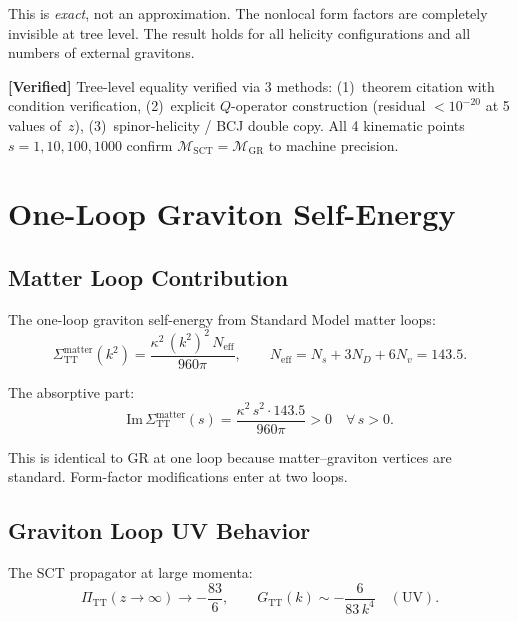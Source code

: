 \documentclass[11pt,a4paper]{article}
\theoremstyle{definition}
\theoremstyle{remark}
\newcommand{\verified}[1]{%
  \par\smallskip\noindent
  \colorbox{green!10}{\parbox{\dimexpr\linewidth-2\fboxsep}{%
    \textcolor{green!50!black}{\textbf{[Verified]}} #1}}%
  \par\smallskip}
\begin{document}
This is \emph{exact}, not an approximation. The nonlocal form factors
are completely invisible at tree level. The result holds for all helicity
configurations and all numbers of external gravitons.

\verified{Tree-level equality verified via 3 methods: (1)~theorem
citation with condition verification, (2)~explicit $Q$-operator
construction (residual $< 10^{-20}$ at 5 values of~$z$),
(3)~spinor-helicity / BCJ double copy. All 4 kinematic points
$s = 1, 10, 100, 1000$ confirm $\mathcal{M}_{\mathrm{SCT}}
= \mathcal{M}_{\mathrm{GR}}$ to machine precision.}

\section{One-Loop Graviton Self-Energy}
\label{sec:oneloop}

\subsection{Matter Loop Contribution}

The one-loop graviton self-energy from Standard Model matter loops:
\begin{equation}
  \Sigma_{\mathrm{TT}}^{\mathrm{matter}}(k^2)
  = \frac{\kappa^2\, (k^2)^2\, N_{\mathrm{eff}}}{960\pi},
  \qquad N_{\mathrm{eff}} = N_s + 3N_D + 6N_v = 143.5.
\end{equation}

The absorptive part:
\begin{equation}
  \mathrm{Im}\,\Sigma_{\mathrm{TT}}^{\mathrm{matter}}(s)
  = \frac{\kappa^2\, s^2 \cdot 143.5}{960\pi} > 0 \quad \forall\, s > 0.
\end{equation}

This is identical to GR at one loop because matter--graviton vertices are
standard. Form-factor modifications enter at two loops.

\subsection{Graviton Loop UV Behavior}

The SCT propagator at large momenta:
\begin{equation}
  \Pi_{\mathrm{TT}}(z \to \infty) \to -\frac{83}{6}, \qquad
  G_{\mathrm{TT}}(k) \sim -\frac{6}{83\, k^4} \quad (\text{UV}).
\end{equation}
\end{document}
